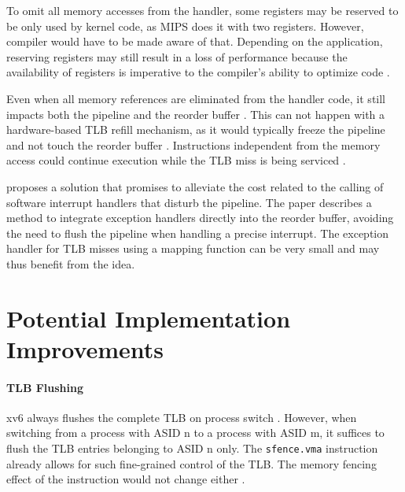 To omit all memory accesses from the handler, some registers may be reserved to be only used by kernel code, as MIPS does it with two registers. However, compiler would have to be made aware of that. Depending on the application, reserving registers may still result in a loss of performance because the availability of registers is imperative to the compiler's ability to optimize code \cite{elphinstone2013l3}.

Even when all memory references are eliminated from the handler code, it still impacts both the pipeline and the reorder buffer \cite{jacobSoftwaremanagedAddressTranslation1997}. This can not happen with a hardware-based TLB refill mechanism, as it would typically freeze the pipeline and not touch the reorder buffer \cite{bhattacharjee2017architectural}. Instructions independent from the memory access could continue execution while the TLB miss is being serviced \cite{jacob1998virtualissues}.

\cite{jaleel2001line} proposes a solution that promises to alleviate the cost related to the calling of software interrupt handlers that disturb the pipeline. The paper describes a method to integrate exception handlers directly into the reorder buffer, avoiding the need to flush the pipeline when handling a precise interrupt. The exception handler for TLB misses using a mapping function can be very small and may thus benefit from the idea.





\section{Potential Implementation Improvements}

\paragraph{TLB Flushing} xv6 always flushes the complete TLB on process switch \cite{cox2011xv6}. However, when switching from a process with ASID n to a process with ASID m, it suffices to flush the TLB entries belonging to ASID n only. The \texttt{sfence.vma} instruction already allows for such fine-grained control of the TLB. The memory fencing effect of the instruction would not change either \cite{RISCVInstructionSet}.


